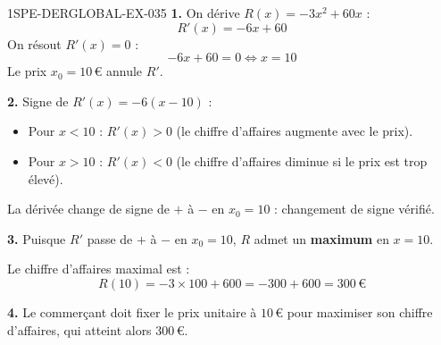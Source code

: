 \begin{corrige}{1SPE-DERGLOBAL-EX-035}
\textbf{1.} On dérive $R(x) = -3x^2 + 60x$ :
\[
R'(x) = -6x + 60
\]
On résout $R'(x) = 0$ :
\[
-6x + 60 = 0 \iff x = 10
\]
Le prix $x_0 = 10\,\text{€}$ annule $R'$.

\textbf{2.} Signe de $R'(x) = -6(x - 10)$ :
\begin{itemize}
\item Pour $x < 10$ : $R'(x) > 0$ (le chiffre d'affaires augmente avec le prix).
\item Pour $x > 10$ : $R'(x) < 0$ (le chiffre d'affaires diminue si le prix est trop élevé).
\end{itemize}
La dérivée change de signe de $+$ à $-$ en $x_0 = 10$ : changement de signe vérifié.

\textbf{3.} Puisque $R'$ passe de $+$ à $-$ en $x_0 = 10$, $R$ admet un \textbf{maximum} en $x = 10$.

Le chiffre d'affaires maximal est :
\[
R(10) = -3 \times 100 + 600 = -300 + 600 = \boxed{300\,\text{€}}
\]

\textbf{4.} Le commerçant doit fixer le prix unitaire à $\boxed{10\,\text{€}}$ pour maximiser son chiffre d'affaires, qui atteint alors $300\,\text{€}$.
\end{corrige}
